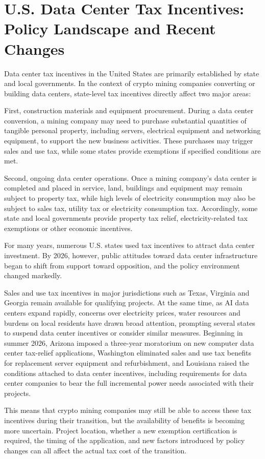\section{U.S. Data Center Tax Incentives: Policy Landscape and Recent Changes}

Data center tax incentives in the United States are primarily established by state and local governments. In the context of crypto mining companies converting or building data centers, state-level tax incentives directly affect two major areas:

First, construction materials and equipment procurement. During a data center conversion, a mining company may need to purchase substantial quantities of tangible personal property, including servers, electrical equipment and networking equipment, to support the new business activities. These purchases may trigger sales and use tax, while some states provide exemptions if specified conditions are met.

Second, ongoing data center operations. Once a mining company's data center is completed and placed in service, land, buildings and equipment may remain subject to property tax, while high levels of electricity consumption may also be subject to sales tax, utility tax or electricity consumption tax. Accordingly, some state and local governments provide property tax relief, electricity-related tax exemptions or other economic incentives.

For many years, numerous U.S. states used tax incentives to attract data center investment. By 2026, however, public attitudes toward data center infrastructure began to shift from support toward opposition, and the policy environment changed markedly.

Sales and use tax incentives in major jurisdictions such as Texas, Virginia and Georgia remain available for qualifying projects. At the same time, as AI data centers expand rapidly, concerns over electricity prices, water resources and burdens on local residents have drawn broad attention, prompting several states to suspend data center incentives or consider similar measures. Beginning in summer 2026, Arizona imposed a three-year moratorium on new computer data center tax-relief applications, Washington eliminated sales and use tax benefits for replacement server equipment and refurbishment, and Louisiana raised the conditions attached to data center incentives, including requirements for data center companies to bear the full incremental power needs associated with their projects.

This means that crypto mining companies may still be able to access these tax incentives during their transition, but the availability of benefits is becoming more uncertain. Project location, whether a new exemption certification is required, the timing of the application, and new factors introduced by policy changes can all affect the actual tax cost of the transition.



\FloatBarrier
